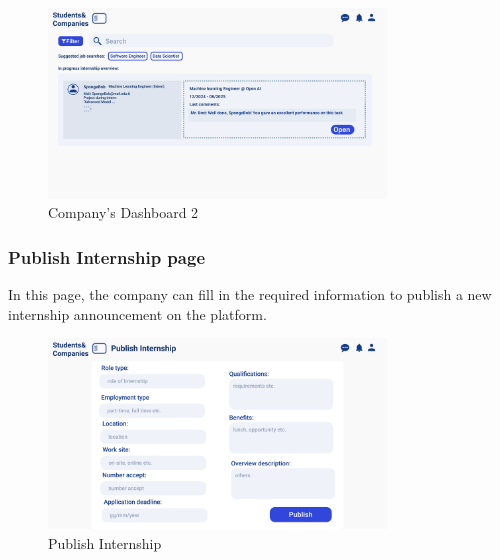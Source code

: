 \begin{figure}[H]
    \centering
    \includegraphics[width=0.8\textwidth]{Images/UI/Dashboard 2-company.png}
    \caption{Company's Dashboard 2}\label{fig:DashboardCompany2}
\end{figure}
\subsubsection{Publish Internship page}
In this page, the company can fill in the required information to publish a new internship announcement on the platform.
\begin{figure}[H]
    \centering
    \includegraphics[width=0.8\textwidth]{Images/UI/Publish Internship -company.png}
    \caption{Publish Internship}\label{fig:Publish Internship}
\end{figure}

